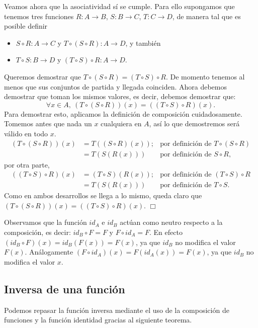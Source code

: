 Veamos ahora que la asociatividad sí se cumple.
Para ello supongamos que tenemos tres funciones $R:A\rightarrow B$, $S:B\rightarrow C$, $T:C\rightarrow D$, de manera tal que es posible definir 
\begin{itemize}
\item $S\circ R:A\rightarrow C$ y $T\circ(S\circ R):A\rightarrow D$, y también
\item $T\circ S:B\rightarrow D$ y $(T\circ S)\circ R:A\rightarrow D$.
\end{itemize}
Queremos demostrar que $T\circ(S\circ R)=(T\circ S)\circ R$.
De momento tenemos al menos que sus conjuntos de partida y llegada coinciden.
Ahora debemos demostrar que toman los mismos valores, es decir, debemos demostrar que:
$$ \forall x\in A,\ (T\circ(S\circ R))(x)=((T\circ S)\circ R)(x).$$
Para demostrar esto, aplicamos la definición de composición cuidadosamente.
Tomemos antes que nada un $x$ cualquiera en $A$, así lo que demostremos será válido en todo $x$.
\begin{align*}
(T\circ(S\circ R))(x)&=T((S\circ R)(x));&\textrm{por definición de }T\circ(S\circ R)\\
&=T(S(R(x)))&\textrm{por definición de }S\circ R,
\end{align*}
por otra parte,
\begin{align*}
((T\circ S)\circ R)(x)&=(T\circ S)(R(x));&\textrm{por definición de }(T\circ S)\circ R\\
&=T(S(R(x)))&\textrm{por definición de }T\circ S.
\end{align*}
Como en ambos desarrollos se llega a lo mismo, queda claro que $(T\circ(S\circ R))(x)=((T\circ S)\circ R)(x)$.
\hfill $\Box$

Observamos que la función $id_A$ e $id_B$ actúan como neutro respecto a la composición, es decir: $id_B\circ F=F$ y $F\circ id_A=F$.
En efecto $(id_B\circ F)(x)=id_B(F(x))=F(x)$, ya que $id_B$ no modifica el valor $F(x)$.
Análogamente $(F\circ id_A)(x)=F(id_A(x))=F(x)$, ya que $id_B$ no modifica el valor $x$.

\subsection{Inversa de una función}

Podemos repasar la función inversa mediante el uso de la composición de funciones y la función identidad gracias al siguiente teorema.

\vspace{.2cm}

